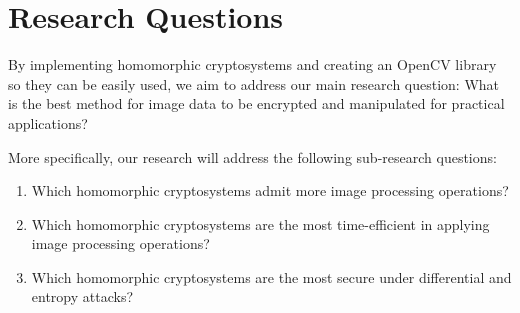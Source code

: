 \section{Research Questions}

By implementing homomorphic cryptosystems and creating an OpenCV library so they can be easily used, we aim to address our main research question: What is the best method for image data to be encrypted and manipulated for practical applications?

More specifically, our research will address the following sub-research questions:
\begin{enumerate}
	\item Which homomorphic cryptosystems admit more image processing operations?
	\item Which homomorphic cryptosystems are the most time-efficient in applying image processing operations?
	\item Which homomorphic cryptosystems are the most secure under differential and entropy attacks?
\end{enumerate}
